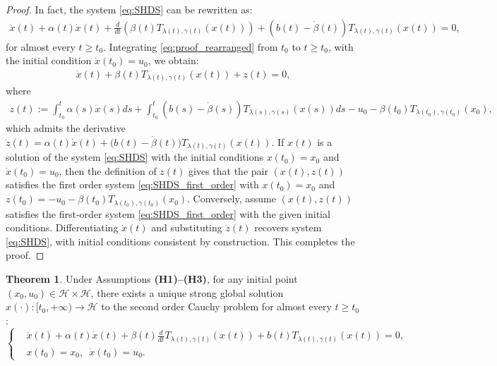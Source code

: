 \documentclass{article}
\theoremstyle{definition}
\newtheorem{theorem}{Theorem}[section]
\theoremstyle{definition}
\theoremstyle{definition}
\begin{document}
\begin{proof}
In fact, the system \eqref{eq:SHDS} can be rewritten as:
\begin{equation}\label{eq:proof_rearranged}
\begin{aligned}
\ddot{x}(t) + \alpha(t)\dot{x}(t) + \frac{d}{dt}\left(\beta(t)T_{\lambda(t), \gamma(t)}(x(t))\right) + \left(b(t) - \dot{\beta}(t)\right)T_{\lambda(t), \gamma(t)}(x(t)) = 0,
\end{aligned}
\end{equation}
for almost every $t \geq t_0$. Integrating \eqref{eq:proof_rearranged} from $t_0$ to $t \geq t_0$, with the initial condition $\dot{x}(t_0) = u_0$, we obtain:
\begin{equation*}
\label{eq:proof_integrated}
\begin{aligned}
\dot{x}(t) + \beta(t)T_{\lambda(t), \gamma(t)}(x(t)) + z(t) = 0,
\end{aligned}
\end{equation*}
where
\begin{equation*}
\begin{aligned}
z(t) := \int_{t_0}^{t} \alpha(s)\dot{x}(s)ds + \int_{t_0}^{t} \left(b(s) - \dot{\beta}(s)\right)T_{\lambda(s), \gamma(s)}(x(s))ds - u_0 - \beta(t_0)T_{\lambda(t_0), \gamma(t_0)}(x_0),
\end{aligned}
\end{equation*}
which admits the derivative $\dot{z}(t) = \alpha(t)\dot{x}(t) + \big(b(t) - \dot{\beta}(t)\big)T_{\lambda(t), \gamma(t)}(x(t))$.
\vskip 1mm
If $x(t)$ is a solution of the system \eqref{eq:SHDS} with the initial conditions $x(t_0) = x_0$ and $\dot{x}(t_0) = u_0$, then the definition of $z(t)$ gives that the pair $(x(t), z(t))$ satisfies the first order system \eqref{eq:SHDS_first_order} with $x(t_0) = x_0$ and $z(t_0) = - u_0 - \beta(t_0)T_{\lambda(t_0), \gamma(t_0)}(x_0)$.
\vskip 1mm
Conversely, assume  $(x(t), z(t))$ 
satisfies the first-order system \eqref{eq:SHDS_first_order} with the given initial conditions. Differentiating $\dot{x}(t)$
and substituting  $\dot{z}(t)$ recovers system \eqref{eq:SHDS}, with initial conditions consistent by construction. This completes the proof.
\end{proof}

\begin{theorem}
\label{thm:existence-uniqueness_SHDS}
Under Assumptions {\rm {\bf (H1)--(H3)}}, for any initial point $(x_0, u_0) \in \mathcal{H} \times \mathcal{H}$, there exists a unique strong global solution $x(\cdot) : [t_0, +\infty) \to \mathcal{H}$ to the second order Cauchy problem for almost every $t \geq t_0$:
\begin{equation*}
\left\{
\begin{aligned}
&\ddot{x}(t) + \alpha(t)\dot{x}(t) + \beta(t)\frac{d}{dt}T_{\lambda(t), \gamma(t)}(x(t)) + b(t)T_{\lambda(t), \gamma(t)}(x(t)) = 0, \\
&x(t_0) = x_0, \,\,\, \dot{x}(t_0) = u_0.
\end{aligned}
\right.
\end{equation*}
\end{theorem}
\end{document}
